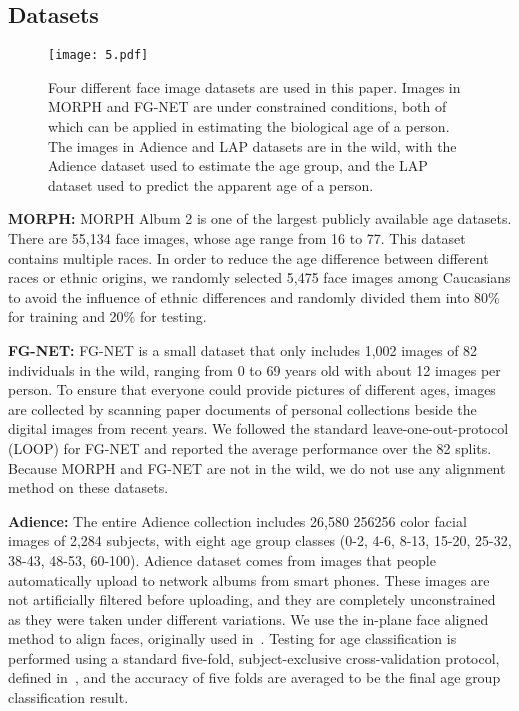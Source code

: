 \documentclass[journal]{IEEEtran}
\begin{document}
\subsection{Datasets}
\begin{figure}
\centering
\texttt{[image: 5.pdf]}
\caption{Four different face image datasets are used in this paper. Images in MORPH and FG-NET are under constrained conditions, both of which can be applied in estimating the biological age of a person. The images in Adience and LAP datasets are in the wild, with the Adience dataset used to estimate the age group, and the LAP dataset used to predict the apparent age of a person.}
\label{fig:Example image}
\end{figure}
\textbf{MORPH:} MORPH Album 2 is one of the largest publicly available age datasets. There are 55,134 face images, whose age range from 16 to 77. This dataset contains multiple races. In order to reduce the age difference between different races or ethnic origins, we randomly selected 5,475 face images among Caucasians to avoid the influence of ethnic differences and randomly divided them into 80\% for training and 20\% for testing.
\par
\textbf{FG-NET:} FG-NET is a small dataset that only includes 1,002 images of 82 individuals in the wild, ranging from 0 to 69 years old with about 12 images per person. To ensure that everyone could provide pictures of different ages, images are collected by scanning paper documents of personal collections beside the digital images from recent years. We followed the standard leave-one-out-protocol (LOOP) for FG-NET and reported the average performance over the 82 splits. Because MORPH and FG-NET are not in the wild, we do not use any alignment method on these datasets.
\par
\textbf{Adience:} The entire Adience collection includes 26,580 256256 color facial images of 2,284 subjects, with eight age group classes (0-2, 4-6, 8-13, 15-20, 25-32, 38-43, 48-53, 60-100). Adience dataset comes from images that people automatically upload to network albums from smart phones. These images are not artificially filtered before uploading, and they are completely unconstrained as they were taken under different variations. We use the in-plane face aligned method to align faces, originally used in~\cite{ref-1}. Testing for age classification is performed using a standard five-fold, subject-exclusive cross-validation protocol, defined in~\cite{ref-16}, and the accuracy of five folds are averaged to be the final age group classification result.
\end{document}
